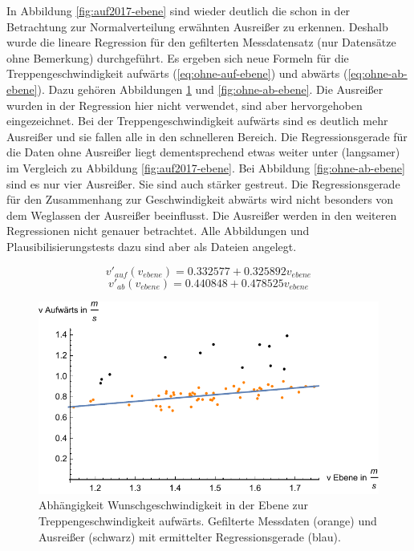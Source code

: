 In Abbildung \ref{fig:auf2017-ebene} sind wieder
deutlich die schon in der Betrachtung zur Normalverteilung erwähnten Ausreißer zu erkennen. Deshalb wurde die lineare Regression für den gefilterten Messdatensatz (nur Datensätze ohne Bemerkung) durchgeführt. Es ergeben sich neue Formeln für die Treppengeschwindigkeit aufwärts (\ref{eq:ohne-auf-ebene}) und abwärts (\ref{eq:ohne-ab-ebene}). Dazu gehören Abbildungen \ref{fig:ohne-auf-ebene} und \ref{fig:ohne-ab-ebene}. Die Ausreißer wurden in der Regression hier nicht verwendet, sind aber hervorgehoben eingezeichnet. Bei der Treppengeschwindigkeit aufwärts sind es deutlich mehr Ausreißer und sie fallen alle in den schnelleren Bereich. Die Regressionsgerade für die Daten ohne Ausreißer liegt dementsprechend 
etwas weiter unter (langsamer) im Vergleich zu Abbildung \ref{fig:auf2017-ebene}. Bei Abbildung \ref{fig:ohne-ab-ebene} sind es nur 
vier Ausreißer. Sie sind auch stärker gestreut. Die Regressionsgerade für den Zusammenhang zur Geschwindigkeit abwärts wird nicht besonders von dem Weglassen der Ausreißer beeinflusst. Die Ausreißer werden in den weiteren Regressionen nicht genauer betrachtet. Alle Abbildungen und Plausibilisierungstests dazu sind aber als Dateien angelegt.

\begin{equation} \label{eq:ohne-auf-ebene}
	v'_{auf}(v_{ebene}) = 0.332577 + 0.325892 v_{ebene}
\end{equation}
\begin{equation} \label{eq:ohne-ab-ebene}
	v'_{ab}(v_{ebene}) = 0.440848 + 0.478525 v_{ebene}
\end{equation}

\begin{figure} \centering 
	\includegraphics[]{abbildungen/regression/2017/ohneausreisser/auf-ebene.pdf}
	
	\caption{Abhängigkeit Wunschgeschwindigkeit in der Ebene zur Treppengeschwindigkeit aufwärts. Gefilterte Messdaten (orange) und Ausreißer (schwarz) mit ermittelter Regressionsgerade (blau). \label{fig:ohne-auf-ebene}}
\end{figure}

